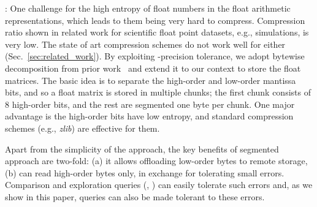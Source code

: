 \documentclass[conference]{IEEEtran}
\begin{document}
: 
One challenge for \weightstore\is the high entropy of float numbers in the float arithmetic representations, which leads to them being very hard to  compress. 
Compression ratio shown in related work for scientific float point datasets, e.g., simulations, is very low. 
The state of art compression schemes do not work well for \dnn\parameters either (Sec.~\ref{sec:related_work}).
By exploiting \dnn\low-precision tolerance, we adopt bytewise decomposition from prior work~\cite{schendel2012isobar,bhattacherjee2014pstore} and extend it to our context to store the float matrices. 
The basic idea is to separate the high-order and low-order mantissa bits, and so a float matrix is stored in multiple chunks; the first chunk consists of 8 high-order bits, and the rest are segmented one byte per chunk. 
One major advantage is the high-order bits have low entropy, and standard compression schemes (e.g., \emph{zlib}) are effective for them.

Apart from the simplicity of the approach, the key benefits of segmented approach are two-fold: (a) it allows offloading low-order bytes to remote storage, (b) \weightstore\queries can read high-order bytes only, in exchange for tolerating small errors.
Comparison and exploration queries (, ) can easily tolerate such errors and, as we show in this paper,  queries can also be made tolerant to these errors.
\end{document}
